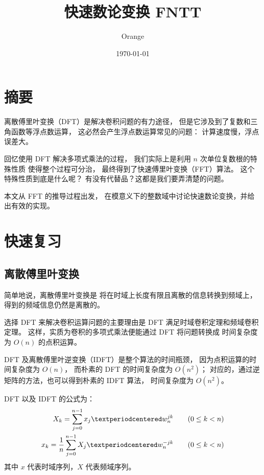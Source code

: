 \documentclass[12pt, UTF8]{article}
\title{快速数论变换 FNTT}
\author{Orange}
\date{\today}
\begin{document}
    \heiti
    \maketitle

    \section{摘要}
    离散傅里叶变换（DFT）是解决卷积问题的有力途径，
    但是它涉及到了复数和三角函数等浮点数运算，
    这必然会产生浮点数运算常见的问题：
    计算速度慢，浮点误差大。

    回忆使用 DFT 解决多项式乘法的过程，
    我们实际上是利用 $n$ 次单位复数根的特殊性质
    使得整个过程可分治，
    最终得到了快速傅里叶变换（FFT）算法。
    这个特殊性质到底是什么呢？
    有没有代替品？这都是我们要弄清楚的问题。

    本文从 FFT 的推导过程出发，
    在模意义下的整数域中讨论快速数论变换，并给出有效的实现。

    \bigskip

    \section{快速复习}
    \subsection{离散傅里叶变换}
    简单地说，离散傅里叶变换是
    将在时域上长度有限且离散的信息转换到频域上，
    得到的频域信息仍然是离散的。

    选择 DFT 来解决卷积运算问题的主要理由是
    DFT 满足时域卷积定理和频域卷积定理。
    这样，实质为卷积的多项式乘法便能通过 DFT 将问题转换成
    时间复杂度为 $O(n)$ 的点积运算。

    DFT 及离散傅里叶逆变换（IDFT）是整个算法的时间瓶颈，
    因为点积运算的时间复杂度为 $O(n)$，
    而朴素的 DFT 的时间复杂度为 $O(n^2)$；
    对应的，通过逆矩阵的方法，也可以得到朴素的 IDFT 算法，
    时间复杂度为 $O(n^2)$。

    \bigskip
    DFT 以及 IDFT 的公式为：
    \begin{align}
        X_k = \sum_{j = 0}^{n - 1} x_j · w_n^{jk} &
        \qquad (0 \le k < n) \notag
        \\
        x_k = \frac {1} {n} \sum_{j = 0}^{n - 1}X_j · w_n^{-jk} &
        \qquad (0 \le k < n) \notag
    \end{align}
    其中 $x$ 代表时域序列，$X$ 代表频域序列。
\end{document}
